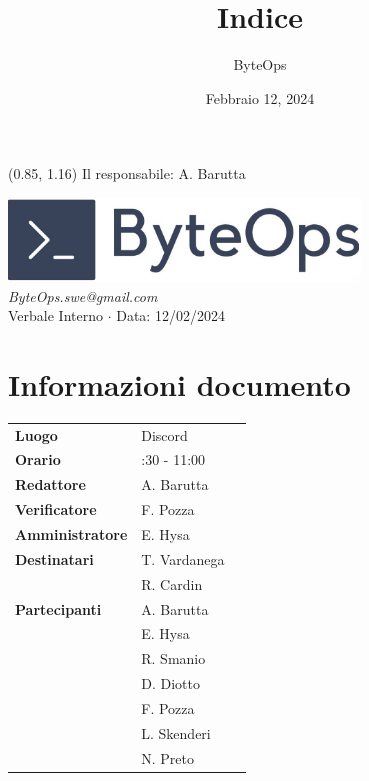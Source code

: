 \documentclass{article}
\title{\textbf{\fontsize{28}{6}\selectfont Indice}}
\author{\fontsize{14}{6}\selectfont ByteOps}
\date{Febbraio 12, 2024}
\begin{document}
\begin{textblock*}{\textwidth}(0.85\textwidth, 1.16\textheight)
    Il responsabile: A. Barutta
\end{textblock*}

\pagestyle{fancy}
\begin{center}
\includegraphics[width = 0.7\textwidth]{../../Images/logo.png} \\
\vspace{0.2cm}
\textcolor[RGB]{60, 60, 60}{\textit{ByteOps.swe@gmail.com}} \\
\vspace{1cm}
\fontsize{16}{6}\selectfont Verbale Interno $\cdot$ Data: 12/02/2024 \\
\vspace{0.5cm}
\end{center}

\section*{Informazioni documento}
\def\arraystretch{1.2}
\begin{tabular}{>{\raggedleft\arraybackslash}p{}|>{\raggedright\arraybackslash}p{}c}
    \hline
    \addlinespace
    \textbf{Luogo} & Discord \vspace{10pt} \\
    \textbf{Orario} & 9:30 - 11:00 \vspace{10pt} \\
    \textbf{Redattore} & A. Barutta \vspace{10pt} \\
    \textbf{Verificatore} & F. Pozza \vspace{10pt} \\
    \textbf{Amministratore} & E. Hysa \vspace{10pt} \\
    \textbf{Destinatari} & T. Vardanega \\ & R. Cardin \vspace{10pt} \\
    \textbf{Partecipanti} & A. Barutta \\ & E. Hysa \\ & R. Smanio \\ & D. Diotto \\ & F. Pozza \\ & L. Skenderi \\ & N. Preto \vspace{10pt} \\
\end{tabular}
\pagebreak 
\end{document}
